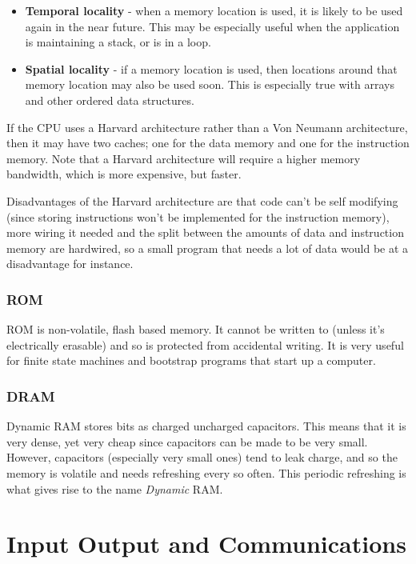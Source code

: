 \begin{itemize}
	\item {\bf Temporal locality} - when a memory location is used, it is likely
	to be used again in the near future. This may be especially useful when the
	application is maintaining a stack, or is in a loop.
	\item {\bf Spatial locality} - if a memory location is used, then locations
	around that memory location may also be used soon. This is especially true
	with arrays and other ordered data structures.
\end{itemize}

If the CPU uses a Harvard architecture rather than a Von Neumann architecture,
then it may have two caches; one for the data memory and one for the instruction
memory. Note that a Harvard architecture will require a higher memory bandwidth,
which is more expensive, but faster.

Disadvantages of the Harvard architecture are that code can't be self modifying
(since storing instructions won't be implemented for the instruction memory),
more wiring it needed and the split between the amounts of data and instruction
memory are hardwired, so a small program that needs a lot of data would be at a
disadvantage for instance.

\subsubsection{ROM}

ROM is non-volatile, flash based memory. It cannot be written to (unless it's
electrically erasable) and so is protected from accidental writing. It is very
useful for finite state machines and bootstrap programs that start up a
computer.

\subsubsection{DRAM}

Dynamic RAM stores bits as charged uncharged capacitors. This means that it is
very dense, yet very cheap since capacitors can be made to be very small.
However, capacitors (especially very small ones) tend to leak charge, and so the
memory is volatile and needs refreshing every so often. This periodic refreshing
is what gives rise to the name {\it Dynamic} RAM.

\section{Input Output and Communications}

